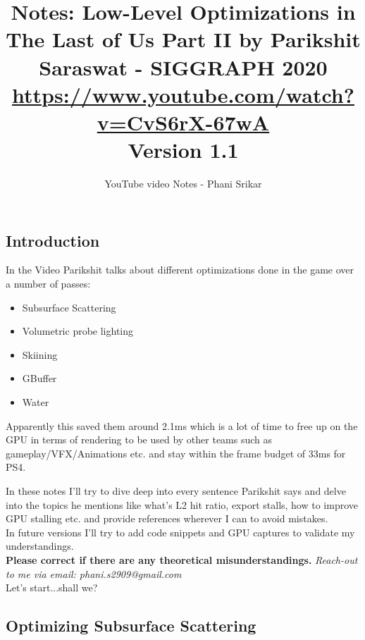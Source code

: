 \documentclass[14pt]{article}
\begin{document}
\title{Notes: Low-Level Optimizations in The Last of Us Part II by Parikshit Saraswat - SIGGRAPH 2020 \\
\large \url{https://www.youtube.com/watch?v=CvS6rX-67wA} \\
\small Version 1.1
}
\author{YouTube video Notes - Phani Srikar}
\date{}
\maketitle

\subsection*{Introduction}
	In the Video Parikshit talks about different optimizations done in the game over a number of passes:
	\begin{itemize}
		\item Subsurface Scattering
		\item Volumetric probe lighting
		\item Skiining
		\item GBuffer
		\item Water
	\end{itemize}
Apparently this saved them around 2.1ms which is a lot of time to free up on the GPU in terms of rendering to be used by other teams such as gameplay/VFX/Animations etc. and stay within the frame budget of 33ms for PS4.

In these notes I'll try to dive deep into every sentence Parikshit says and delve into the topics he mentions like what's L2 hit ratio, export stalls, how to improve GPU stalling etc. and provide references wherever I can to avoid mistakes. \\  

In future versions I'll try to add code snippets and GPU captures to validate my understandings. \\

\textbf{Please correct if there are any theoretical misunderstandings.}
\textit{Reach-out to me via email: phani.s2909@gmail.com} \\

Let's start...shall we?


\subsection*{Optimizing Subsurface Scattering}
\end{document}

